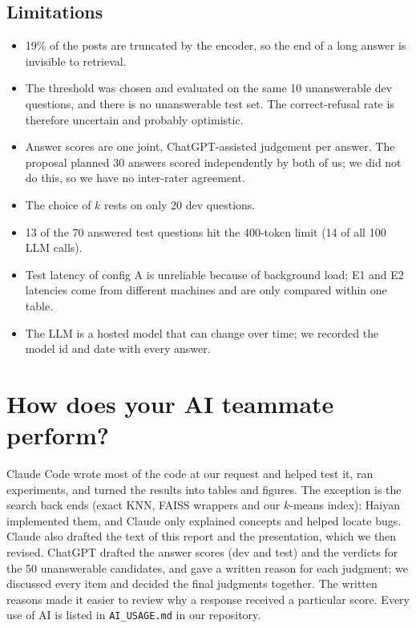 \documentclass[11pt]{article}
\begin{document}
\subsection{Limitations}
\begin{itemize}[leftmargin=*]
\item 19\% of the posts are truncated by the encoder, so the end of a long answer is invisible to retrieval.
\item The threshold was chosen and evaluated on the same 10 unanswerable dev questions, and there is no
unanswerable test set. The correct-refusal rate is therefore uncertain and probably optimistic.
\item Answer scores are one joint, ChatGPT-assisted judgement per answer. The proposal planned 30 answers scored
independently by both of us; we did not do this, so we have no inter-rater agreement.
\item The choice of $k$ rests on only 20 dev questions.
\item 13 of the 70 answered test questions hit the 400-token limit (14 of all 100 LLM calls).
\item Test latency of config A is unreliable because of background load; E1 and E2 latencies come from different
machines and are only compared within one table.
\item The LLM is a hosted model that can change over time; we recorded the model id and date with every answer.
\end{itemize}

\section{How does your AI teammate perform?}

Claude Code wrote most of the code at our request and helped test it, ran experiments, and turned the results into
tables and figures. The exception is the search back ends (exact KNN, FAISS wrappers and our $k$-means index):
Haiyan implemented them, and Claude only explained concepts and helped locate bugs. Claude also drafted the text of
this report and the presentation, which we then revised. ChatGPT drafted the answer scores (dev and test) and the
verdicts for the 50 unanswerable candidates, and gave a written reason for each judgment; we discussed every item
and decided the final judgments together. The written reasons made it easier to review why a response received a
particular score. Every use of AI is listed in \texttt{AI\_USAGE.md} in our repository.
\end{document}
